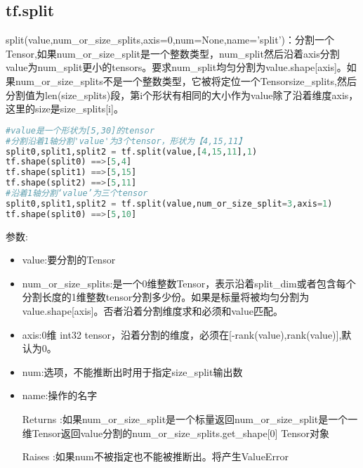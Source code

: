 \subsection{tf.split}
split(value,num\_or\_size\_splits,axis=0,num=None,name='split')：分割一个Tensor,如果num\_or\_size\_split是一个整数类型，num\_split然后沿着axis分割value为num\_split更小的tensors。要求num\_split均匀分割为value.shape[axis]。如果num\_or\_size\_splits不是一个整数类型，它被将定位一个Tensorsize\_splits,然后分割值为len(size\_splits)段，第i个形状有相同的大小作为value除了沿着维度axis，这里的size是size\_splits[i]。
\begin{lstlisting}[language=Python]
#value是一个形状为[5,30]的tensor
#分割沿着1轴分割'value'为3个tensor，形状为【4,15,11】
split0,split1,split2 = tf.split(value,[4,15,11],1)
tf.shape(split0) ==>[5,4]
tf.shape(split1) ==>[5,15]
tf.shape(split2) ==>[5,11]
#沿着1轴分割‘value’为三个tensor
split0,split1,split2 = tf.split(value,num_or_size_split=3,axis=1)
tf.shape(split0) ==>[5,10]
\end{lstlisting}
参数:
\begin{itemize}
	\item value:要分割的Tensor
	\item num\_or\_size\_splits:是一个0维整数Tensor，表示沿着split\_dim或者包含每个分割长度的1维整数tensor分割多少份。如果是标量将被均匀分割为value.shape[axis]。否者沿着分割维度求和必须和value匹配。
	\item axis:0维 int32 tensor，沿着分割的维度，必须在[-rank(value),rank(value)],默认为0。
	\item num:选项，不能推断出时用于指定size\_split输出数
	\item name:操作的名字
	\item [Returns]:如果num\_or\_size\_split是一个标量返回num\_or\_size\_split是一个一维Tensor返回value分割的num\_or\_size\_splits.get\_shape[0] Tensor对象
	\item [Raises]:如果num不被指定也不能被推断出。将产生ValueError
\end{itemize}
